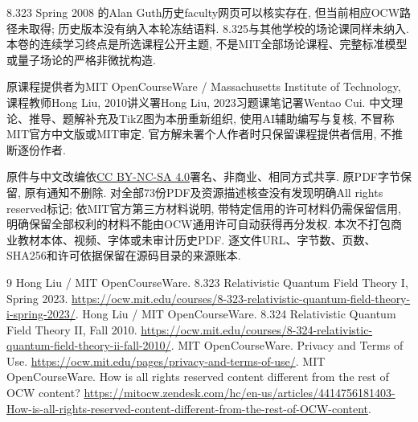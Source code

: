 8.323 Spring 2008 的Alan Guth历史faculty网页可以核实存在, 但当前相应OCW路径未取得; 历史版本没有纳入本轮冻结语料. 8.325与其他学校的场论课同样未纳入. 本卷的连续学习终点是所选课程公开主题, 不是MIT全部场论课程、完整标准模型或量子场论的严格非微扰构造.

原课程提供者为MIT OpenCourseWare / Massachusetts Institute of Technology, 课程教师Hong Liu, 2010讲义署Hong Liu, 2023习题课笔记署Wentao Cui. 中文理论、推导、题解补充及TikZ图为本册重新组织, 使用AI辅助编写与复核, 不冒称MIT官方中文版或MIT审定. 官方解未署个人作者时只保留课程提供者信用, 不推断逐份作者.

原件与中文改编依\href{https://creativecommons.org/licenses/by-nc-sa/4.0/}{CC BY-NC-SA 4.0}署名、非商业、相同方式共享. 原PDF字节保留, 原有通知不删除. 对全部73份PDF及资源描述核查没有发现明确All rights reserved标记; 依MIT官方第三方材料说明, 带特定信用的许可材料仍需保留信用, 明确保留全部权利的材料不能由OCW通用许可自动获得再分发权. 本次不打包商业教材本体、视频、字体或未审计历史PDF. 逐文件URL、字节数、页数、SHA256和许可依据保留在源码目录的来源账本.
\begin{thebibliography}{9}
 Hong Liu / MIT OpenCourseWare. 8.323 Relativistic Quantum Field Theory I, Spring 2023. \url{https://ocw.mit.edu/courses/8-323-relativistic-quantum-field-theory-i-spring-2023/}.
 Hong Liu / MIT OpenCourseWare. 8.324 Relativistic Quantum Field Theory II, Fall 2010. \url{https://ocw.mit.edu/courses/8-324-relativistic-quantum-field-theory-ii-fall-2010/}.
 MIT OpenCourseWare. Privacy and Terms of Use. \url{https://ocw.mit.edu/pages/privacy-and-terms-of-use/}.
 MIT OpenCourseWare. How is all rights reserved content different from the rest of OCW content? \url{https://mitocw.zendesk.com/hc/en-us/articles/4414756181403-How-is-all-rights-reserved-content-different-from-the-rest-of-OCW-content}.
\end{thebibliography}
